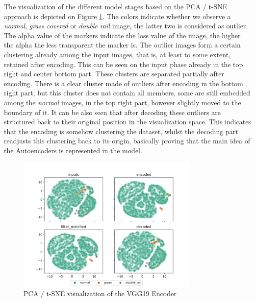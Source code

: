 The visualization of the different model stages based on the PCA / t-SNE approach is depicted on
Figure \ref{fig:vgg19_pca}.
The colors indicate whether we observe a \emph{normal}, \emph{grass covered} or \emph{double rail}
image, the latter two is considered as outlier.
The alpha value of the markers indicate the loss value of the image, the higher the alpha
the less transparent the marker is.
The outlier images form a certain clustering already among the input images, that is, at least to some
extent, retained after encoding.
This can be seen on the input phase already in the top right and center bottom part.
These clusters are separated partially after encoding.
There is a clear cluster made of outliers after encoding in the bottom right part,
but this cluster does not contain all members, some are still embedded among the \emph{normal} images,
in the top right part, however slightly moved to the boundary of it.
It can be also seen that after decoding these outliers are structured back to their original position
in the visualization space.
This indicates that the encoding is somehow clustering the dataset, whilst the decoding part readjusts
this clustering back to its origin, basically proving that the main idea of the Autoencoders is
represented in the model.

\begin{figure}[H]
    \centering
    \includegraphics[width=0.8\textwidth,trim={0 0 0 1cm},clip]{./results/vgg19_vgg19/20230510_172958_feature_vectors_1.png}
    \caption{PCA / t-SNE visualization of the VGG19 Encoder}
    \label{fig:vgg19_pca}
\end{figure}

